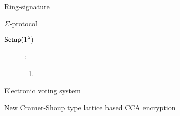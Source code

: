 \begin{subsection}{Ring-signature}
\begin{paragraph}{$\Sigma$-protocol}
\begin{description}
\begin{enumerate}
        \end{enumerate}

    \end{description}
  \end{paragraph}
  \begin{description}
    \item[${\mathsf{Setup}}(1^{\lambda})$]:
    \begin{enumerate}
      \item
    \end{enumerate}
  \end{description}
\end{subsection}

\begin{subsection}{Electronic voting system}
\end{subsection}

\begin{subsection}{New Cramer-Shoup type lattice based CCA encryption}
\end{subsection}
